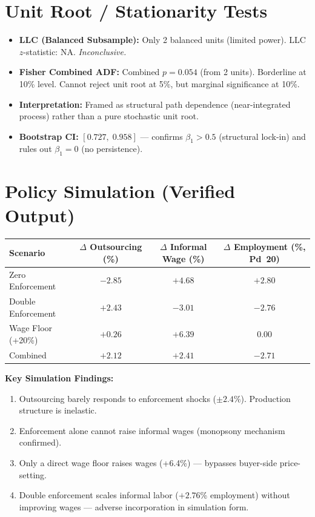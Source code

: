 \documentclass[11pt]{article}
\begin{document}
	\section{Unit Root / Stationarity Tests}
	\begin{itemize}
		\item \textbf{LLC (Balanced Subsample):} Only 2 balanced units (limited power). LLC $z$-statistic: NA. \textit{Inconclusive.}
		\item \textbf{Fisher Combined ADF:} Combined $p = 0.054$ (from 2 units). Borderline at 10\% level. Cannot reject unit root at 5\%, but marginal significance at 10\%.
		\item \textbf{Interpretation:} Framed as structural path dependence (near-integrated process) rather than a pure stochastic unit root. 
		\item \textbf{Bootstrap CI:} $[0.727,\; 0.958]$ — confirms $\beta_1 > 0.5$ (structural lock-in) and rules out $\beta_1 = 0$ (no persistence).
	\end{itemize}
	
	\section{Policy Simulation (Verified Output)}
	
	\begin{center}
		\begin{tabular}{lccc}
			\toprule
			Scenario & $\Delta$ Outsourcing (\%) & $\Delta$ Informal Wage (\%) & $\Delta$ Employment (\%, Pd~20) \\
			\midrule
			Zero Enforcement & $-2.85$ & $+4.68$ & $+2.80$ \\
			Double Enforcement & $+2.43$ & $-3.01$ & $-2.76$ \\
			Wage Floor (+20\%) & $+0.26$ & $+6.39$ & $0.00$ \\
			Combined & $+2.12$ & $+2.41$ & $-2.71$ \\
			\bottomrule
		\end{tabular}
	\end{center}
	
	\textbf{Key Simulation Findings:}
	\begin{enumerate}
		\item Outsourcing barely responds to enforcement shocks ($\pm 2.4$\%). Production structure is inelastic.
		\item Enforcement alone cannot raise informal wages (monopsony mechanism confirmed).
		\item Only a direct wage floor raises wages (+6.4\%) — bypasses buyer-side price-setting.
		\item Double enforcement scales informal labor ($+2.76$\% employment) without improving wages — adverse incorporation in simulation form.
	\end{enumerate}
	
\end{document}

